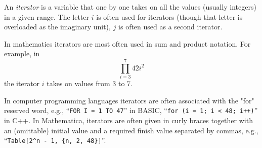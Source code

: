 \documentclass[12pt]{article}
\begin{document}
An \emph{iterator} is a variable that one by one takes on all the values (usually integers) in a given range. The letter $i$ is often used for iterators (though that letter is overloaded as the imaginary unit), $j$ is often used as a second iterator.

In mathematics iterators are most often used in sum and product notation. For example, in $$\prod_{i = 3}^7 42i^2$$ the iterator $i$ takes on values from 3 to 7.

In computer programming languages iterators are often associated with the "for" reserved word, e.g., ``\verb!FOR I = 1 TO 47!'' in BASIC, ``\verb!for (i = 1; i < 48; i++)!'' in C++. In Mathematica, iterators are often given in curly braces together with an (omittable) initial value and a required finish value separated by commas, e.g., ``\verb=Table[2^n - 1, {n, 2, 48}]=''.
\end{document}
